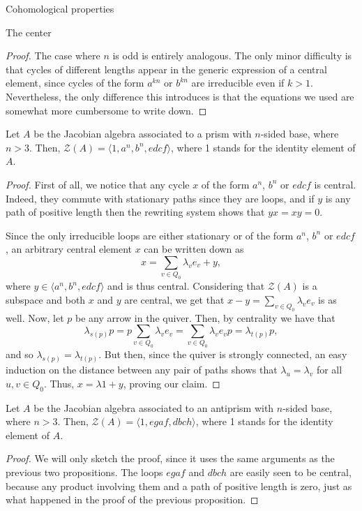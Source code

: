 \begin{chapter}{Cohomological properties}
\begin{section}{The center}
\begin{proof}
The case where $n$ is odd is entirely analogous. The only minor difficulty is that cycles of different lengths appear in the generic expression of a central element, since cycles of the form $a^{kn}$ or $b^{kn}$ are irreducible even if $k>1$. Nevertheless, the only difference this introduces is that the equations we used are somewhat more cumbersome to write down.
\end{proof}

\begin{prop} Let $A$ be the Jacobian algebra associated to a prism with $n$-sided base, where $n>3$. Then, $\mathcal{Z}(A) = \langle 1, a^n, b^n, edcf\rangle$, where 1 stands for the identity element of $A$.
\end{prop}
\begin{proof} First of all, we notice that any cycle $x$ of the form $a^n$, $b^n$ or $edcf$ is central. Indeed, they commute with stationary paths since they are loops, and if $y$ is any path of positive length then the rewriting system shows that $yx=xy=0$.

Since the only irreducible loops are either stationary or of the form $a^n$, $b^n$ or $edcf$, an arbitrary central element $x$ can be written down as 
\[x = \sum_{v\in Q_0} \lambda_v e_v + y,\]
where $y\in \langle a^n,b^n, edcf\rangle$ and is thus central. Considering that $\mathcal{Z}(A)$ is a subspace and both $x$ and $y$ are central, we get that $x-y=\sum_{v\in Q_0} \lambda_v e_v$ is as well. Now, let $p$ be any arrow in the quiver. Then, by centrality we have that
\[\lambda_{s(p)}p= p\sum_{v\in Q_0} \lambda_v e_v=\sum_{v\in Q_0} \lambda_v e_vp = \lambda_{t(p)}p,\]
and so $\lambda_{s(p)}=\lambda_{t(p)}$. But then, since the quiver is strongly connected, an easy induction on the distance between any pair of paths shows that $\lambda_u=\lambda_v$ for all $u,v\in Q_0$. Thus, $x= \lambda 1 +y$, proving our claim.
\end{proof}

\begin{prop} Let $A$ be the Jacobian algebra associated to an antiprism with $n$-sided base, where $n>3$. Then, $\mathcal{Z}(A) = \langle 1, egaf, dbch\rangle$, where 1 stands for the identity element of $A$.
\end{prop}
\begin{proof} We will only sketch the proof, since it uses the same arguments as the previous two propositions. The loops $egaf$ and $dbch$ are easily seen to be central, because any product involving them and a path of positive length is zero, just as what happened in the proof of the previous proposition.


\end{proof}
\end{section}
\end{chapter}

